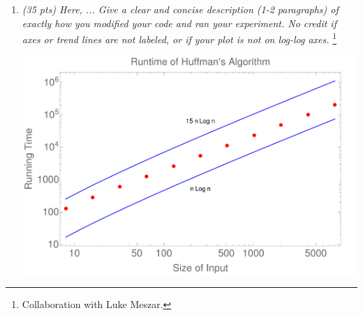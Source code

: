 \documentclass[12pt]{article}
\begin{document}
\begin{enumerate}
\begin{enumerate}
    \textit{where $f_{i}$ is the frequency in {\tt x} of the $i$th symbol of $\Sigma$, and $\ell$ is the length of {\tt x}. Because we take $\log_{2}$, $H$ has units of ``bits.'' Using Eq.~\eqref{q:H}, compute (i) the predicted 
number of bits per symbol needed to optimally encode the Frost poem, and (ii) the predicted number of bits needed to encode the entire poem.}
    
    Using the function \texttt{findEntropy} in our attached code, we found H for the provided data file to be  with a subsequent size of encoded poem at $4.1254 * 761 = \boxed{\text{3139.4294 
bits}}$

	\item \textit{Now, encode {\tt x} using your Huffman encoder from part~\eqref{q:1:code} and report the number of bits in the encoded string. Compare this number to the lower bound obtained in part~\eqref{q:1:entropy}, and 
comment on the comparison.}
	
    Using our implementation of Huffman Encoding, our encoded string was length  This is remarkably close to the lower bound of 3139. Our reasoning behind why this isn't at 3139 is that there are many ties of 
frequencies in the data file, with something like 5 different characters appearing only once. This will lead to an unbalanced encoding tree, which is suboptimal. 
		
	\end{enumerate}


    \newpage
	\item \textit{(35 pts) Here, ... Give a clear and concise description (1-2 paragraphs) of exactly how you modified your code and ran your experiment. No credit if axes or trend lines are not labeled, or if your plot is not 
on log-log axes.} \footnote{Collaboration with Luke Meszar.}
	
	\includegraphics[width=\textwidth]{ps5p2-results}
	

\end{enumerate}
\end{document}
